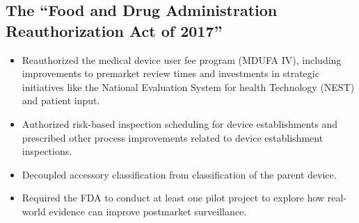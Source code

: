 \documentclass[11pt]{book}
\begin{document}
\subsection{The ``Food and Drug Administration Reauthorization Act of 2017''}
\begin{itemize}
	\item Reauthorized the medical device user fee program (MDUFA IV), including improvements to premarket review times and investments in strategic initiatives like the National Evaluation System for health Technology (NEST) and patient input.
	\item Authorized risk-based inspection scheduling for device establishments and prescribed other process improvements related to device establishment inspections.
	\item Decoupled accessory classification from classification of the parent device.
	\item Required the FDA to conduct at least one pilot project to explore how real-world evidence can improve postmarket surveillance.
\end{itemize}
\end{document}
